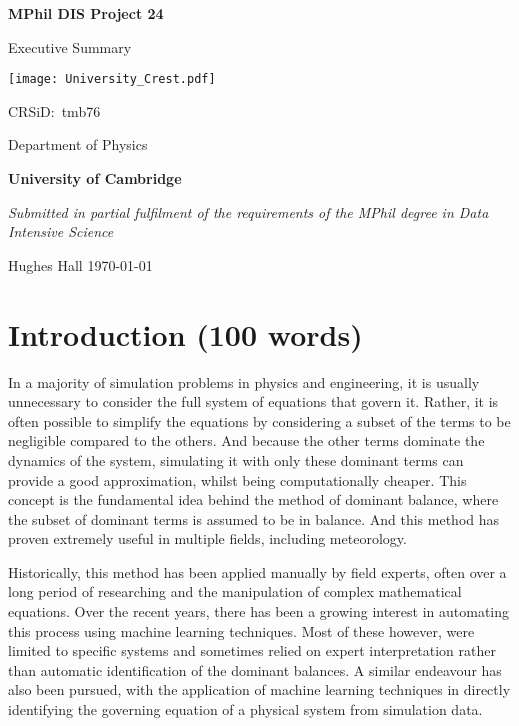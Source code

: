 \documentclass[12pt]{report} %
\begin{document}
\begin{titlepage}
	\centering
	{\LARGE\bfseries MPhil DIS Project 24\par}
	{\LARGE Executive Summary\par}
	\vspace{1cm}
	{\texttt{[image: University\_Crest.pdf]}\par}
	{\Large CRSiD:\ tmb76\par}
	\vspace{1cm}
	{\Large Department of Physics\par}
	{\Large\bfseries University of Cambridge\par}
	\vfill
	{\itshape Submitted in partial fulfilment of the requirements of the MPhil degree in Data Intensive Science}
	\vfill
	{\large Hughes Hall  \hspace{6cm} \today\par}
\end{titlepage}


\tableofcontents


\section{Introduction (100 words)}


In a majority of simulation problems in physics and engineering, it is usually unnecessary to consider the full system of equations that govern it. Rather, it is often possible to simplify the equations by considering a subset of the terms to be negligible compared to the others. And because the other terms dominate the dynamics of the system, simulating it with only these dominant terms can provide a good approximation, whilst being computationally cheaper. This concept is the fundamental idea behind the method of dominant balance, where the subset of dominant terms is assumed to be in balance. And this method has proven extremely useful in multiple fields, including meteorology\cite{charney1947dynamics, phillips1963geostrophic, burger1958scale, yano2009scale}.

\vspace{5mm}

Historically, this method has been applied manually by field experts, often over a long period of researching and the manipulation of complex mathematical equations. Over the recent years, there has been a growing interest in automating this process using machine learning techniques. Most of these however, were limited to specific systems and sometimes relied on expert interpretation rather than automatic identification of the dominant balances\cite{ortwood2016robust,lee2018detection,sonnewald2019unsupervised}. A similar endeavour has also been pursued, with the application of machine learning techniques in directly identifying the governing equation of a physical system from simulation data\cite{brunton2016discovering, cranmer2020discovering}.
\end{document}
